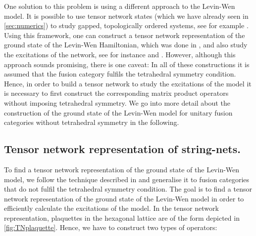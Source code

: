One solution to this problem is using a different approach to the Levin-Wen model. It is possible to use tensor network states (which we have already seen in \cref{sec:numerics}) to study gapped, topologically ordered systems, see for example \cite{Bultinck2017}. Using this framework, one can construct a tensor network representation of the ground state of the Levin-Wen Hamiltonian, which was done in \cite{Buerschaper2009}, and also study the excitations of the network, see for instance \cite{Sahinoglu2014} and \cite{Williamson2017}. However, although this approach sounds promising, there is one caveat: In all of these constructions it is assumed that the fusion category fulfils the tetrahedral symmetry condition. Hence, in order to build a tensor network to study the excitations of the model it is necessary to first construct the corresponding matrix product operators without imposing tetrahedral symmetry. We go into more detail about the construction of the ground state of the Levin-Wen model for unitary fusion categories without tetrahedral symmetry in the following.


\subsection*{Tensor network representation of string-nets.}  To find a tensor network representation of the ground state of the Levin-Wen model, we follow the technique described in \cite{Buerschaper2009} and generalise it to fusion categories that do not fulfil the tetrahedral symmetry condition. The goal is to find a tensor network representation of the ground state of the Levin-Wen model in order to efficiently calculate the excitations of the model. In the tensor network representation, plaquettes in the hexagonal lattice are of the form depicted in \cref{fig:TNplaquette}. Hence, we have to construct two types of operators:

